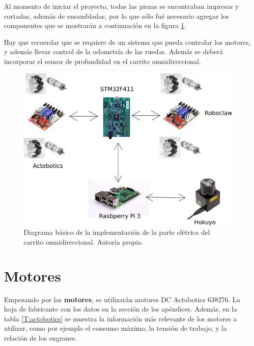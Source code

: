 Al momento de iniciar el proyecto, todas las piezas se encontraban impresas y cortadas, además de ensambladas, por lo que sólo fué necesario agregar los componentes que se mostrarán a continuación en la figura \ref{F:diagrama}.

Hay que recoerdar que se requiere de un sistema que pueda controlar los motores, y además llevar control de la odometría de las ruedas. Además se deberá incorporar el sensor de profundidad en el carrito omnidireccional.

\begin{figure}[H]
\centering
\includegraphics[scale=0.6]{imagenes/diagrama_diseno.png}
\caption{Diagrama básico de la implementación de la parte elétrica del carrito omnidireccional. Autoría propia.}
\label{F:diagrama}
\end{figure}

\section{Motores}

Empezando por los \textbf{motores}, se utilizarán motores DC Actobotics 638276. La hoja de fabricante con los datos en la sección de los apéndices. Además, en la tabla \ref{T:actobotics} se muestra la información más relevante de los motores a utilizar, como por ejemplo el consumo máximo, la tensión de trabajo, y la relación de los engranes.


